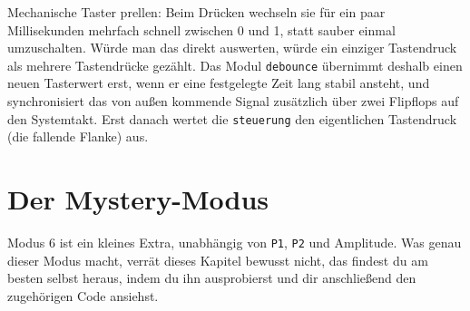Mechanische Taster \glqq prellen\grqq{}: Beim Drücken wechseln sie für ein paar Millisekunden mehrfach schnell zwischen 0 und 1, statt sauber einmal umzuschalten. Würde man das direkt auswerten, würde ein einziger Tastendruck als mehrere Tastendrücke gezählt. Das Modul \texttt{debounce} übernimmt deshalb einen neuen Tasterwert erst, wenn er eine festgelegte Zeit lang stabil ansteht, und synchronisiert das von außen kommende Signal zusätzlich über zwei Flipflops auf den Systemtakt. Erst danach wertet die \texttt{steuerung} den eigentlichen Tastendruck (die fallende Flanke) aus.

\section{Der Mystery-Modus}

Modus 6 ist ein kleines Extra, unabhängig von \texttt{P1}, \texttt{P2} und Amplitude. Was genau dieser Modus macht, verrät dieses Kapitel bewusst nicht, das findest du am besten selbst heraus, indem du ihn ausprobierst und dir anschließend den zugehörigen Code ansiehst.
